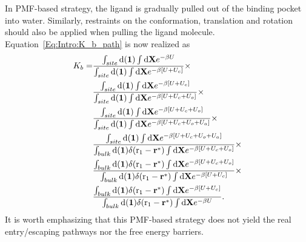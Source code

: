 In PMF-based strategy, the ligand is gradually pulled out of the binding pocket into water. Similarly, restraints on the conformation, translation and rotation should also be applied when pulling the ligand molecule. Equation~\ref{Eq:Intro:K_b_path} is now realized as
\begin{align}
K_b=&\frac{\int_{site}\diff(\mathbf{1})\int \diff\mathbf{X}e^{-\beta U}}{\int_{site}\diff(\mathbf{1})\int \diff\mathbf{X}e^{-\beta [U+U_c]}}\times\notag\\
    &\frac{\int_{site}\diff(\mathbf{1})\int \diff\mathbf{X}e^{-\beta [U+U_c]}}{\int_{site}\diff(\mathbf{1})\int \diff\mathbf{X}e^{-\beta [U+U_c+U_o]}}\times\notag\\
    &\frac{\int_{site}\diff(\mathbf{1})\int \diff\mathbf{X}e^{-\beta [U+U_c+U_o]}}{\int_{site}\diff(\mathbf{1})\int \diff\mathbf{X}e^{-\beta [U+U_c+U_o+U_a]}}\times\notag\\
    &\frac{\int_{site}\diff(\mathbf{1})\int \diff\mathbf{X}e^{-\beta [U+U_c+U_o+U_a]}}{\int_{bulk}\diff(\mathbf{1})\delta(\mathrm{r}_1-\mathbf{r}^*)\int \diff\mathbf{X}e^{-\beta [U+U_c+U_o]}}\times\notag\\
    &\frac{\int_{bulk}\diff(\mathbf{1})\delta(\mathrm{r}_1-\mathbf{r}^*)\int \diff\mathbf{X}e^{-\beta [U+U_c+U_o]}}{\int_{bulk}\diff(\mathbf{1})\delta(\mathrm{r}_1-\mathbf{r}^*)\int \diff\mathbf{X}e^{-\beta [U+U_c]}}\times\notag\\
    &\frac{\int_{bulk}\diff(\mathbf{1})\delta(\mathrm{r}_1-\mathbf{r}^*)\int \diff\mathbf{X}e^{-\beta [U+U_c]}}{\int_{bulk}\diff(\mathbf{1})\delta(\mathrm{r}_1-\mathbf{r}^*)\int \diff\mathbf{X}e^{-\beta U}}.
\end{align}
It is worth emphasizing that this PMF-based strategy does not yield the real entry/escaping pathways nor the free energy barriers.